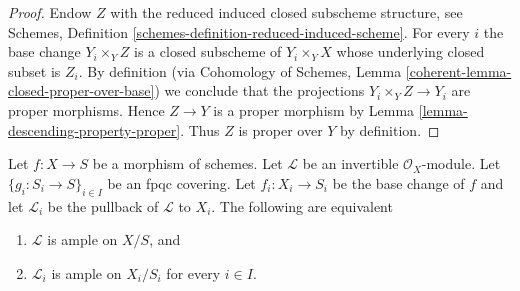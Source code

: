 \begin{proof}
Endow $Z$ with the reduced induced closed subscheme structure, see
Schemes, Definition \ref{schemes-definition-reduced-induced-scheme}.
For every $i$ the base change $Y_i \times_Y Z$ is a closed subscheme
of $Y_i \times_Y X$ whose underlying closed subset is $Z_i$.
By definition (via
Cohomology of Schemes, Lemma \ref{coherent-lemma-closed-proper-over-base})
we conclude that the projections $Y_i \times_Y Z \to Y_i$ are proper
morphisms. Hence $Z \to Y$ is a proper morphism by
Lemma \ref{lemma-descending-property-proper}.
Thus $Z$ is proper over $Y$ by definition.
\end{proof}

\begin{lemma}
\label{lemma-descending-property-ample}
Let $f : X \to S$ be a morphism of schemes.
Let $\mathcal{L}$ be an invertible $\mathcal{O}_X$-module.
Let $\{g_i : S_i \to S\}_{i \in I}$ be an fpqc covering.
Let $f_i : X_i \to S_i$ be the base change of $f$ and let $\mathcal{L}_i$
be the pullback of $\mathcal{L}$ to $X_i$.
The following are equivalent
\begin{enumerate}
\item $\mathcal{L}$ is ample on $X/S$, and
\item $\mathcal{L}_i$ is ample on $X_i/S_i$
for every $i \in I$.
\end{enumerate}
\end{lemma}

